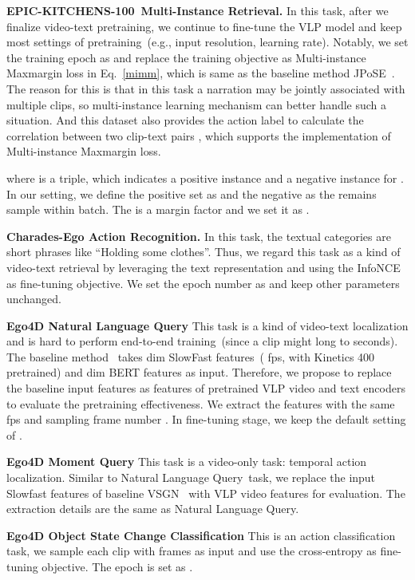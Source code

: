 \documentclass{article}
\newcommand{\epic}{EPIC-KITCHENS-100}
\newcommand{\nlq}{Natural Language Query}
\newcommand{\mq}{Moment Query}
\newcommand{\ossc}{Object State Change Classification}
\begin{document}
\noindent\textbf{\epic~Multi-Instance Retrieval.}
In this task, after we finalize video-text pretraining, we continue to fine-tune the VLP model and keep most settings of pretraining~(e.g., input resolution, learning rate). 
Notably, we set the training epoch as  and replace the training objective as Multi-instance Maxmargin loss in Eq.~\ref{mimm}, which is same as the baseline method JPoSE~\cite{wray2019fine}.
The reason for this is that in this task a narration may be jointly associated with multiple clips, so multi-instance learning mechanism can better handle such a situation. And this dataset also provides the action label to calculate the correlation  between two clip-text pairs , which supports the implementation of Multi-instance Maxmargin loss.

where  is a triple, which indicates a positive instance  and a negative instance  for . 
In our setting, we define the positive set as  and the negative as the remains sample within batch. The  is a margin factor and we set it as .

\noindent\textbf{Charades-Ego Action Recognition.}
In this task, the textual categories are short phrases like ``Holding some clothes''. 
Thus, we regard this task as a kind of video-text retrieval by leveraging the text representation and using the InfoNCE as fine-tuning objective.
We set the epoch number as  and keep other parameters unchanged.

\noindent\textbf{Ego4D \nlq}
This task is a kind of video-text localization and is hard to perform end-to-end training~(since a clip might long to  seconds).
The baseline method~\cite{zhang2020span} takes  dim SlowFast features~( fps, with Kinetics 400 pretrained) and  dim BERT features as input.
Therefore, we propose to replace the baseline input features as features of pretrained VLP video and text encoders to evaluate the pretraining effectiveness.
We extract the features with the same fps  and sampling frame number .
In fine-tuning stage, we keep the default setting of \cite{zhang2020span}.

\noindent\textbf{Ego4D \mq}
This task is a video-only task: temporal action localization. Similar to \nlq~task, we replace the input Slowfast features of baseline VSGN~\cite{zhao2021video} with VLP video features for evaluation. The extraction details are the same as \nlq.

\noindent\textbf{Ego4D \ossc}
This is an action classification task, we sample each clip with  frames as input and use the cross-entropy as fine-tuning objective. The epoch is set as .
\end{document}
